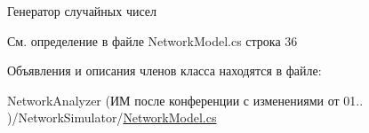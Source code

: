 Генератор случайных чисел 



См. определение в файле Network\+Model.\+cs строка 36



Объявления и описания членов класса находятся в файле\+:\begin{DoxyCompactItemize}
\item 
Network\+Analyzer (ИМ после конференции  с изменениями от 01.. )/\+Network\+Simulator/\hyperlink{_network_model_8cs}{Network\+Model.\+cs}\end{DoxyCompactItemize}
